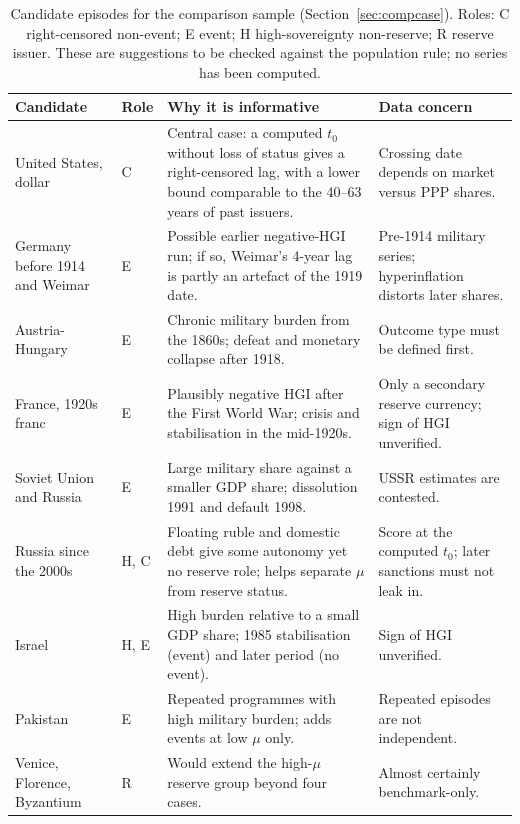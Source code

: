 \documentclass[11pt,letterpaper]{article}
\theoremstyle{definition}
\theoremstyle{plain}
\begin{document}
\begin{table}[H]\centering\small
\caption{Candidate episodes for the comparison sample (Section~\ref{sec:compcase}). Roles: C right-censored non-event; E event; H high-sovereignty non-reserve; R reserve issuer. These are suggestions to be checked against the population rule; no series has been computed.}\label{tab:cand}
\begin{tabular}{@{}p{2.5cm}p{0.8cm}p{6.0cm}p{2.8cm}@{}}
\toprule
Candidate & Role & Why it is informative & Data concern\\\midrule
United States, dollar & C & Central case: a computed $t_0$ without loss of status gives a right-censored lag, with a lower bound comparable to the 40--63 years of past issuers. & Crossing date depends on market versus PPP shares.\\[6pt]
Germany before 1914 and Weimar & E & Possible earlier negative-HGI run; if so, Weimar's 4-year lag is partly an artefact of the 1919 date. & Pre-1914 military series; hyperinflation distorts later shares.\\[6pt]
Austria-Hungary & E & Chronic military burden from the 1860s; defeat and monetary collapse after 1918. & Outcome type must be defined first.\\[6pt]
France, 1920s franc & E & Plausibly negative HGI after the First World War; crisis and stabilisation in the mid-1920s. & Only a secondary reserve currency; sign of HGI unverified.\\[6pt]
Soviet Union and Russia & E & Large military share against a smaller GDP share; dissolution 1991 and default 1998. & USSR estimates are contested.\\[6pt]
Russia since the 2000s & H, C & Floating ruble and domestic debt give some autonomy yet no reserve role; helps separate $\mu$ from reserve status. & Score at the computed $t_0$; later sanctions must not leak in.\\[6pt]
Israel & H, E & High burden relative to a small GDP share; 1985 stabilisation (event) and later period (no event). & Sign of HGI unverified.\\[6pt]
Pakistan & E & Repeated programmes with high military burden; adds events at low $\mu$ only. & Repeated episodes are not independent.\\[6pt]
Venice, Florence, Byzantium & R & Would extend the high-$\mu$ reserve group beyond four cases. & Almost certainly benchmark-only.\\
\bottomrule
\end{tabular}
\end{table}
\end{document}
